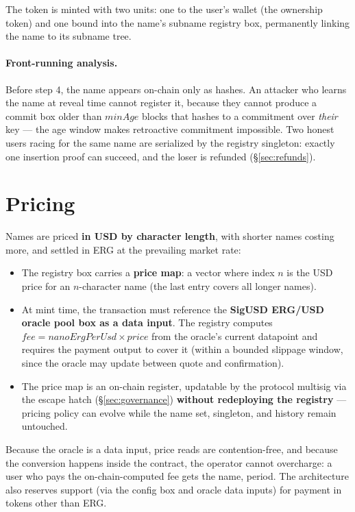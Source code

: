 \documentclass[11pt]{article}
\begin{document}
The token is minted with two units: one to the user's wallet (the ownership
token) and one bound into the name's subname registry box, permanently
linking the name to its subname tree.

\paragraph{Front-running analysis.}
Before step 4, the name appears on-chain only as hashes. An attacker who
learns the name at reveal time cannot register it, because they cannot
produce a commit box older than $\mathit{minAge}$ blocks that hashes to a
commitment over \emph{their} key --- the age window makes retroactive
commitment impossible. Two honest users racing for the same name are
serialized by the registry singleton: exactly one insertion proof can
succeed, and the loser is refunded (\S\ref{sec:refunds}).

\section{Pricing}
\label{sec:pricing}

Names are priced \textbf{in USD by character length}, with shorter names
costing more, and settled in ERG at the prevailing market rate:

\begin{itemize}
  \item The registry box carries a \textbf{price map}: a vector where index
        $n$ is the USD price for an $n$-character name (the last entry covers
        all longer names).
  \item At mint time, the transaction must reference the \textbf{SigUSD
        ERG/USD oracle pool box as a data input}. The registry computes
        $\mathit{fee} = \mathit{nanoErgPerUsd} \times \mathit{price}$ from the
        oracle's current datapoint and requires the payment output to cover
        it (within a bounded slippage window, since the oracle may update
        between quote and confirmation).
  \item The price map is an on-chain register, updatable by the protocol
        multisig via the escape hatch (\S\ref{sec:governance})
        \textbf{without redeploying the registry} --- pricing policy can
        evolve while the name set, singleton, and history remain untouched.
\end{itemize}

Because the oracle is a data input, price reads are contention-free, and
because the conversion happens inside the contract, the operator cannot
overcharge: a user who pays the on-chain-computed fee gets the name, period.
The architecture also reserves support (via the config box and oracle data
inputs) for payment in tokens other than ERG.
\end{document}
